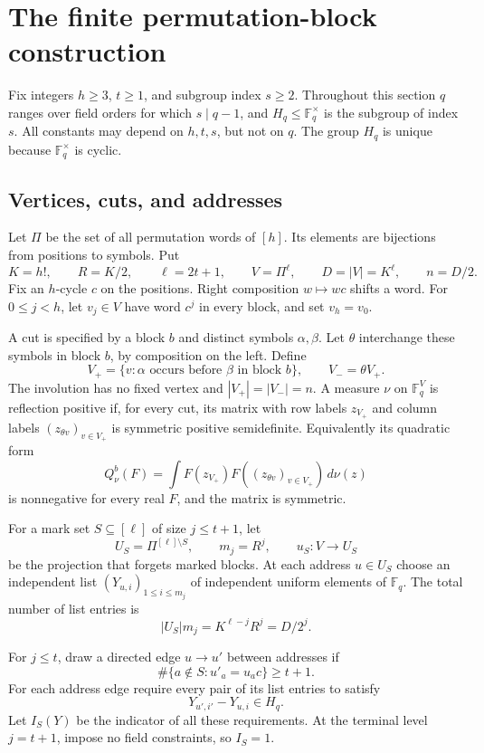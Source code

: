 \documentclass[11pt,a4paper]{article}
\numberwithin{equation}{section}
\theoremstyle{definition}
\theoremstyle{remark}
\newcommand{\F}{\mathbb F}
\begin{document}
\section{The finite permutation-block construction}
\label{sec:construction}

Fix integers $h\ge3$, $t\ge1$, and subgroup index $s\ge2$. Throughout
this section $q$ ranges over field orders for which $s\mid q-1$, and
$H_q\le\F_q^\times$ is the subgroup of index $s$. All constants may
depend on $h,t,s$, but not on $q$. The group $H_q$ is unique because
$\F_q^\times$ is cyclic.

\subsection{Vertices, cuts, and addresses}

Let $\Pi$ be the set of all permutation words of $[h]$. Its elements
are bijections from positions to symbols. Put
\begin{equation}
 K=h!,\qquad R=K/2,\qquad \ell=2t+1,\qquad
 V=\Pi^\ell,\qquad D=|V|=K^\ell,\qquad n=D/2.
 \label{eq:parameters}
\end{equation}
Fix an $h$-cycle $c$ on the positions. Right composition $w\mapsto wc$
shifts a word. For $0\le j<h$, let $v_j\in V$ have word $c^j$ in
every block, and set $v_h=v_0$.

A cut is specified by a block $b$ and distinct symbols $\alpha,\beta$.
Let $\theta$ interchange these symbols in block $b$, by composition on
the left. Define
\[
 V_+=\{v:\alpha\text{ occurs before }\beta\text{ in block }b\},
 \qquad V_-=\theta V_+.
\]
The involution has no fixed vertex and $|V_+|=|V_-|=n$.
A measure $\nu$ on $\F_q^V$ is reflection positive if, for every cut,
its matrix with row labels $z_{V_+}$ and column labels
$(z_{\theta v})_{v\in V_+}$ is symmetric positive semidefinite.
Equivalently its quadratic form
\[
 Q_\nu^b(F)=\int F(z_{V_+})F((z_{\theta v})_{v\in V_+})\,d\nu(z)
\]
is nonnegative for every real $F$, and the matrix is symmetric.

For a mark set $S\subseteq[\ell]$ of size $j\le t+1$, let
\[
 U_S=\Pi^{[\ell]\setminus S},\qquad m_j=R^j,
 \qquad u_S:V\to U_S
\]
be the projection that forgets marked blocks. At each address $u\in U_S$
choose an independent list $(Y_{u,i})_{1\le i\le m_j}$ of independent
uniform elements of $\F_q$. The total number of list entries is
\[
 |U_S|m_j=K^{\ell-j}R^j=D/2^j.
\]

For $j\le t$, draw a directed edge $u\to u'$ between addresses if
\begin{equation}
 \#\{a\notin S:u'_a=u_ac\}\ge t+1.
 \label{eq:addressedge}
\end{equation}
For each address edge require every pair of its list entries to satisfy
\begin{equation}
 Y_{u',i'}-Y_{u,i}\in H_q.
 \label{eq:listconstraints}
\end{equation}
Let $I_S(Y)$ be the indicator of all these requirements. At the terminal
level $j=t+1$, impose no field constraints, so $I_S=1$.
\end{document}
